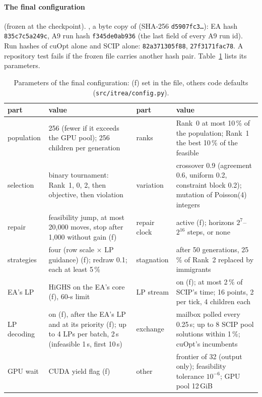 \paragraph{The final configuration} (frozen at the checkpoint). , a byte copy of
 (SHA-256 \texttt{d5907fc3\ldots}): EA hash \texttt{835c7c5a249c}, A9
run hash \texttt{f345de0ab936} (the last field of every A9 run id). Run hashes of cuOpt alone and SCIP alone:
\texttt{82a371305f88}, \texttt{27f3171fac78}. A repository test fails if the frozen file carries another hash pair.
Table~\ref{tab:params} lists its parameters.

\begin{table}[!tb]\centering\scriptsize
\caption{Parameters of the final configuration: (f) set in the file, others code defaults
(\texttt{src/itrea/config.py}).}\label{tab:params}
\setlength{\tabcolsep}{3pt}
\begin{tabular}{>{\raggedright}p{1.7cm}>{\raggedright}p{6.05cm}>{\raggedright}p{1.7cm}>{\raggedright\arraybackslash}p{6.05cm}}
\toprule
part & value & part & value \\
\midrule
population & 256 (fewer if it exceeds the GPU pool); 256 children per generation & ranks & Rank~0 at most 10\,\% of
  the population; Rank~1 the best 10\,\% of the feasible \\
selection & binary tournament: Rank~1, 0, 2, then objective, then violation & variation & crossover 0.9 (agreement
  0.6, uniform 0.2, constraint block 0.2); mutation of Poisson(4) integers \\
repair & feasibility jump, at most 20{,}000 moves, stop after 1{,}000 without gain (f) & repair clock & active (f);
  horizons $2^7$--$2^{16}$ steps, or none \\
strategies & four (row scale $\times$ LP guidance) (f); redraw 0.1; each at least 5\,\% & stagnation & after 50
  generations, 25\,\% of Rank~2 replaced by immigrants \\
EA's LP & HiGHS on the EA's core (f), 60-s limit & LP stream & on (f); at most 2\,\% of SCIP's time; 16 points,
  2 per tick, 4 children each \\
LP decoding & on (f), after the EA's LP and at its priority (f); up to 4 LPs per batch, 2\,s (infeasible 1\,s, first
  10\,s) & exchange & mailbox polled every 0.25\,s; up to 8 SCIP pool solutions within 1\,\%; cuOpt's incumbents \\
GPU wait & CUDA yield flag (f) & other & frontier of 32 (output only); feasibility tolerance $10^{-6}$; GPU pool
  12\,GiB \\
\bottomrule
\end{tabular}
\end{table}

